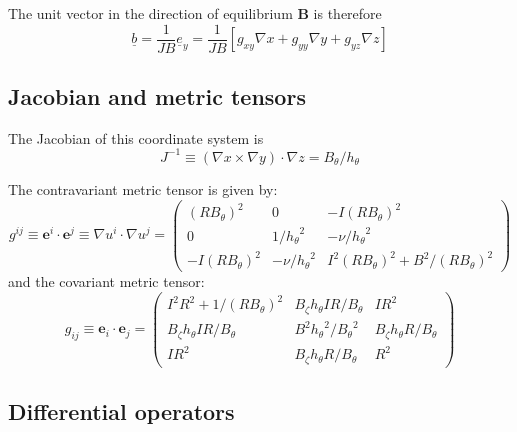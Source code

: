 \documentclass[12pt]{article}
\newcommand{\hthe}{\ensuremath{h_\theta}}
\newcommand{\Bp}{\ensuremath{B_\theta}}
\newcommand{\Bt}{\ensuremath{B_\zeta}}
\newcommand{\Vec}[1]{\ensuremath{\mathbf{#1}}}
\newcommand{\Bvec}{\Vec{B}}
\newcommand{\rbp}{\ensuremath{R\Bp}}
\newcommand{\rbpsq}{\ensuremath{\left(\rbp\right)^2}}
\begin{document}
The unit vector in the direction of equilibrium $\Bvec$ is therefore
\[
\underline{b} = \frac{1}{JB}\underline{e}_y = \frac{1}{JB}\left[g_{xy}\nabla x + g_{yy}\nabla y + g_{yz}\nabla z\right]
\]

\subsection{Jacobian and metric tensors}

The Jacobian of this coordinate system is
\[
J^{-1} \equiv \left(\nabla x\times\nabla y\right)\cdot\nabla z = \Bp / \hthe
\]

The contravariant metric tensor is given by:
\[
g^{ij} \equiv \Vec{e}^i \cdot\Vec{e}^j \equiv \nabla u^i \cdot \nabla u^j = \left(\begin{array}{ccc}
\left(R\Bp\right)^2 & 0 & -I\left(R\Bp\right)^2 \\
0 & 1 / \hthe^2 & -\nu / \hthe^2 \\
-I\left(R\Bp\right)^2 & -\nu / \hthe^2 & I^2\left(R\Bp\right)^2 + B^2 / \left(R\Bp\right)^2 \end{array} \right)
\]
and the covariant metric tensor:
\[
g_{ij} \equiv \Vec{e}_i \cdot\Vec{e}_j = \left(\begin{array}{ccc}
I^2 R^2 + 1 / \rbpsq & \Bt\hthe I R / \Bp & I R^2 \\
\Bt\hthe I R / \Bp & B^2\hthe^2 / \Bp^2 & \Bt\hthe R / \Bp \\
I R^2 & \Bt\hthe R / \Bp & R^2 \end{array} \right)
\]

\subsection{Differential operators}
\end{document}

